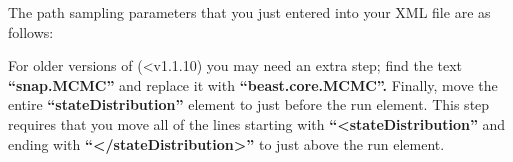 {The path sampling parameters that you just entered into your XML file are as follows:

    \begin{compactdesc}
       \item[\field{chainLength: MCMC sample length for each path sampling step.}]
       \item[\field{alpha: parameter used to space out path sampling steps.}]
       \item[\field{rootdir: directory for storing output. Be sure that the folder exists before starting the run.}]
       \item[\field{burnInPercentage: burn-In percentage used for analyzing the log files.}]
       \item[\field{preBurnin: number of samples that are discarded for the first step, but not the others.}]
       \item[\field{deleteOldLogs: delete existing log files from rootdir}]
      \item[\field{nrOfSteps: the number of path sampling steps to use}]
    \end{compactdesc}
    
For older versions of  (<v1.1.10) you may need an extra step; find the text {\bf ``snap.MCMC''} and replace it with {\bf ``beast.core.MCMC''.}  
Finally, move the entire {\bf ``stateDistribution''} element to just before the run element. This step requires that you move all of the lines starting with {\bf ``<stateDistribution''} and ending with {\bf ``</stateDistribution>''} to just above the run element.


}

        

